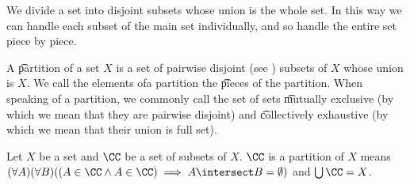 

We divide a set into disjoint subsets whose union is the whole set.
In this way we can handle each subset of the main set individually, and so handle the entire set piece by piece.


A \t{partition} of a set $X$ is a set of pairwise disjoint (see ) subsets of $X$ whose union is $X$.
We call the elements ofa  partition the \t{pieces} of the partition.
When speaking of a partition, we commonly call the set of sets \t{mutually exclusive} (by which we mean that they are pairwise disjoint) and \t{collectively exhaustive} (by which we mean that their union is full set).


Let $X$ be a set and $\CC$ be a set of subsets of $X$.
$\CC$ is a partition of $X$ means $(\forall A)(\forall B)((A \in \CC \land A \in \CC) \implies A \intersect B = \emptyset)$ and $\bigcup \CC = X$.

\blankpage
